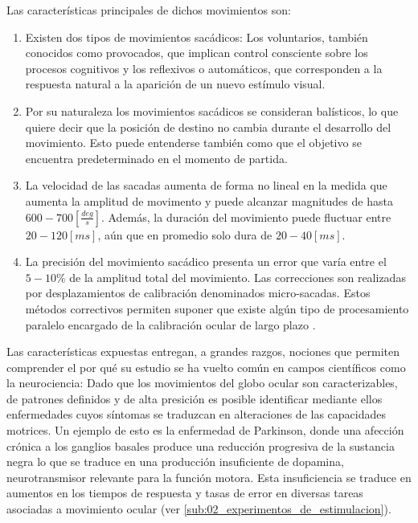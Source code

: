 \documentclass[../main.tex]{subfiles}
\begin{document}
		Las características principales de dichos movimientos son:
		\begin{enumerate}
			\item Existen dos tipos de movimientos sacádicos: Los voluntarios, también conocidos como provocados, que implican control consciente sobre los procesos cognitivos y los reflexivos o automáticos, que corresponden a la respuesta natural a la aparición de un nuevo estímulo visual.

			\item Por su naturaleza los movimientos sacádicos se consideran balísticos, lo que quiere decir que la posición de destino no cambia durante el desarrollo del movimiento. Esto puede entenderse también como que el objetivo se encuentra predeterminado en el momento de partida.

			\item La velocidad de las sacadas aumenta de forma no lineal en la medida que aumenta la amplitud de movimento y puede alcanzar magnitudes de hasta $600 - 700[\frac{deg}{s}]$. Además, la duración del movimiento puede fluctuar entre $20 - 120[ms]$, aún que en promedio solo dura de $20-40[ms]$. 

			\item La precisión del movimiento sacádico presenta un error que varía entre el $5-10\%$ de la amplitud total del movimiento. Las correcciones son realizadas por desplazamientos de calibración denominados micro-sacadas. Estos métodos correctivos permiten suponer que existe algún tipo de procesamiento paralelo encargado de la calibración ocular de largo plazo \cite{article:movOcular2}.  

		\end{enumerate}

		Las características expuestas entregan, a grandes razgos, nociones que permiten comprender el por qué su estudio se ha vuelto común en campos científicos como la neurociencia: Dado que los movimientos del globo ocular son caracterizables, de patrones definidos y de alta presición es posible identificar mediante ellos enfermedades cuyos síntomas se traduzcan en alteraciones de las capacidades motrices. Un ejemplo de esto es la enfermedad de Parkinson, donde una afección crónica a los ganglios basales produce una reducción progresiva de la sustancia negra lo que se traduce en una producción insuficiente de dopamina, neurotransmisor relevante para la función motora. Esta insuficiencia se traduce en aumentos en los tiempos de respuesta y tasas de error en diversas tareas asociadas a movimiento ocular \cite{article:tests_1, article:tests_2, article:tests_3, article:tests_4} (ver \ref{sub:02_experimentos_de_estimulacion}).    
\end{document}
